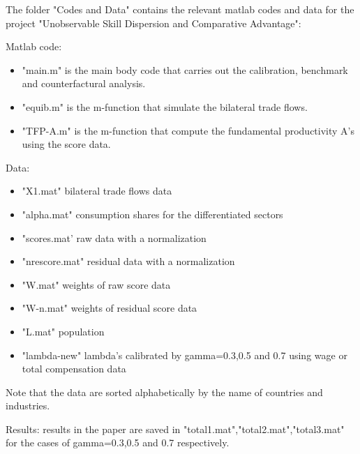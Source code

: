 \documentclass[10pt]{article}
\begin{document}
\noindent The folder "Codes and Data" contains the relevant matlab codes and data for the project "Unobservable Skill Dispersion and Comparative Advantage":

\bigskip
\noindent Matlab code:
\begin{itemize}
\item  "main.m" is the main body code that carries out the calibration, benchmark and counterfactural analysis. 
\item  "equib.m" is the m-function that simulate the bilateral trade flows.
\item  "TFP-A.m" is the m-function that compute the fundamental productivity A's using the score data.
\end{itemize}

\noindent Data:
\begin{itemize}
\item "X1.mat" bilateral trade flows data 
\item "alpha.mat" consumption shares for the differentiated sectors
\item "scores.mat'  raw data with a normalization
\item "nrescore.mat" residual data with a normalization
\item "W.mat"  weights of raw score data 
\item "W-n.mat" weights of residual score data
\item "L.mat"  population
\item "lambda-new" lambda's calibrated by gamma=0.3,0.5 and 0.7 using wage or total compensation data 
\end{itemize}
\noindent Note that the data are sorted alphabetically by the name of countries and industries.

\bigskip
\noindent Results: results in the paper are saved in "total1.mat","total2.mat","total3.mat" for the cases of gamma=0.3,0.5 and 0.7 respectively.
\end{document}

